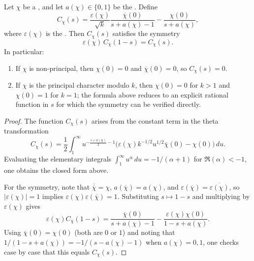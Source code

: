 \begin{lemma} \label{lemma:constant_terms_in_the_functional_equation_for_dirichlet_L_functions}
Let $\chi$ be a , and let $a(\chi) \in \{0,1\}$ be the . Define
$$C_\chi(s) = \frac{\varepsilon(\chi)}{\sqrt{k}} \frac{\overline{\chi}(0)}{s + a(\chi) - 1} - \frac{\chi(0)}{s + a(\chi)},$$
where $\varepsilon(\chi)$ is the . Then $C_\chi(s)$ satisfies the symmetry
$$\varepsilon(\chi) \, C_{\overline{\chi}}(1 - s) = C_\chi(s).$$
In particular:
\begin{enumerate}
    \item If $\chi$ is non-principal, then $\chi(0) = 0$ and $\overline{\chi}(0) = 0$, so $C_\chi(s) = 0$.
    \item If $\chi$ is the principal character modulo $k$, then $\chi(0) = 0$ for $k > 1$ and $\chi(0) = 1$ for $k = 1$; the formula above reduces to an explicit rational function in $s$ for which the symmetry can be verified directly.
\end{enumerate}
\end{lemma}
\begin{proof}
The function $C_\chi(s)$ arises from the constant term in the theta transformation
$$C_\chi(s) = \frac{1}{2} \int_1^\infty u^{-\frac{s + a(\chi)}{2} - 1} \bigl( \varepsilon(\chi) k^{-1/2} u^{1/2} \overline{\chi}(0) - \chi(0) \bigr) \, du.$$
Evaluating the elementary integrals $\int_1^\infty u^{\alpha} \, du = -1/(\alpha+1)$ for $\Re(\alpha) < -1$, one obtains the closed form above.

For the symmetry, note that $\overline{\overline{\chi}} = \chi$, $a(\overline{\chi}) = a(\chi)$, and $\varepsilon(\overline{\chi}) = \overline{\varepsilon(\chi)}$, so $|\varepsilon(\chi)| = 1$ implies $\varepsilon(\chi) \varepsilon(\overline{\chi}) = 1$. Substituting $s \mapsto 1-s$ and multiplying by $\varepsilon(\chi)$ gives
$$\varepsilon(\chi) C_{\overline{\chi}}(1-s) = \frac{\overline{\chi}(0)}{s + a(\chi) - 1} - \frac{\varepsilon(\chi) \chi(0)}{1 - s + a(\chi)}.$$
Using $\overline{\chi}(0) = \chi(0)$ (both are $0$ or $1$) and noting that $1/(1 - s + a(\chi)) = -1/(s - a(\chi) - 1)$ when $a(\chi) = 0,1$, one checks case by case that this equals $C_\chi(s)$.
\end{proof}